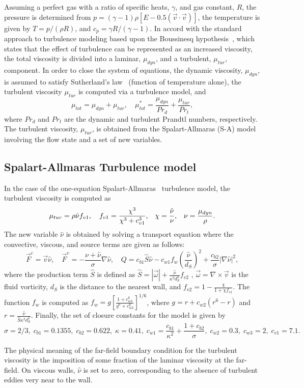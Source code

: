 Assuming a perfect gas with a ratio of specific heats, $\gamma$, and gas constant, $R$, the pressure is determined from $p = (\gamma-1) \rho \left [ E - 0.5(\vec{v} \cdot \vec{v} ) \right ]$, the temperature is given by $T = p/(\rho R)$, and $c_p= \gamma R/(\gamma - 1)$. In accord with the standard approach to turbulence modeling based upon the Boussinesq hypothesis~\cite{wilcox98}, which states that the effect of turbulence can be represented as an increased viscosity, the total viscosity is divided into a laminar, $\mu _{dyn}$, and a turbulent, $\mu _{tur}$, component. In order to close the system of equations, the dynamic viscosity, $\mu _{dyn}$, is assumed to satisfy Sutherland's law~\cite{White1974} (function of temperature alone), the turbulent viscosity $\mu_{tur}$ is computed via a turbulence model, and
\begin{equation}
\label{eq:viscosities}
\mu _{tot}=\mu _{dyn}+\mu _{tur}, \quad
\mu _{tot}^*=\frac{\mu _{dyn}}{Pr_{d}}+\frac{\mu _{tur}}{Pr_{t}},
\end{equation}
where $Pr_{d}$ and $Pr_{t}$ are the dynamic and turbulent Prandtl numbers, respectively.  The turbulent viscosity, $\mu_{tur}$, is obtained from the Spalart-Allmaras (S-A) model involving the flow state and a set of new variables. 

\subsection*{Spalart-Allmaras Turbulence model}
In the case of the one-equation Spalart-Allmaras~\cite{spalart1992} turbulence model, the turbulent viscosity is computed as
\begin{equation} \label{eq nutur}
\mu _{tur}=\rho \hat{\nu}f_{v1},\quad f_{v1}=\frac{\chi ^{3}}{\chi ^{3}+c_{v1}^{3}}\mbox{,}\quad \chi =\frac{%
\hat{\nu}}{\nu }\mbox{,}\quad \nu =\frac{\mu _{dyn}}{\rho }.
\end{equation}
The new variable $\hat \nu$ is obtained by solving a transport equation where the convective, viscous, and source terms are given as follows:
\begin{equation} \label{eq:tersa0}
\vec F^{c} =  \vec v\hat{\nu},\quad
\vec F^{v} =  - \frac{\nu +\hat{\nu}}{\sigma }\nabla\hat{\nu},\quad
Q =  c_{b1}\hat{S}\hat{\nu}-c_{w1}f_{w}\left( \frac{\hat{\nu}}{d_{S}}\right) ^{2}+\frac{c_{b2}}{\sigma } |\nabla \hat{\nu}|^{2},
\end{equation}
where the production term $\hat S$ is defined as $\hat{S} = |\vec \omega| +\frac{\hat{\nu}}{\kappa ^{2}d_{S}^{2}}f_{v2}$ , $\vec \omega= \nabla \times \vec v$ is the fluid vorticity, $d_{S}$ is the distance to the nearest wall, and $f_{v2}=1-\frac{\chi }{1+\chi f_{v1}}$. The function $f_{w}$ is computed as $f_{w}=g\left[ \frac{1+c_{w3}^{6}}{g^{6}+c_{w3}^{6}}\right] ^{1/6}$, where $g=r+c_{w2}(r^{6}-r)$ and $r=\frac{\hat{\nu}}{\hat{S}\kappa ^{2}d_{S}^{2}}$. Finally, the set of closure constants for the model is given by 
\begin{equation}
\sigma =2/3,\;  c_{b1}=0.1355,\; c_{b2}=0.622,\; \kappa =0.41, \;c_{w1}=\frac{c_{b1}}{\kappa^2}+\frac{1+c_{b2}}{\sigma}, \; c_{w2}=0.3, \; c_{w3}=2, \; c_{v1}=7.1. 
\end{equation}

The physical meaning of the far-field boundary condition for the turbulent viscosity is the imposition of some fraction of the laminar viscosity at the far-field. On viscous walls, $\hat{\nu}$ is set to zero, corresponding to the absence of turbulent eddies very near to the wall.

